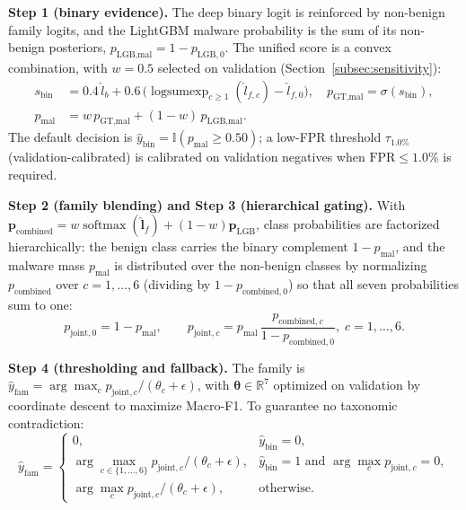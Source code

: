\documentclass[Number]{sn-jnl}
\begin{document}
\textbf{Step 1 (binary evidence).}
The deep binary logit is reinforced by non-benign family logits, and the LightGBM malware probability is the sum of its non-benign posteriors, $p_{\text{LGB},\text{mal}}=1-p_{\text{LGB},0}$. The unified score is a convex combination, with $w=0.5$ selected on validation (Section~\ref{subsec:sensitivity}):
\begin{equation}
\begin{aligned}
  s_\text{bin} &= 0.4\,\hat{l}_b + 0.6\,\Big(\operatorname{logsumexp}_{c \geq 1}(\hat{l}_{f,c}) - \hat{l}_{f,0}\Big),\quad p_{\text{GT},\text{mal}}=\sigma(s_\text{bin}),\\
  p_\text{mal} &= w\,p_{\text{GT},\text{mal}} + (1-w)\,p_{\text{LGB},\text{mal}}.
\end{aligned}
\end{equation}
The default decision is $\hat{y}_\text{bin}=\mathbb{I}(p_\text{mal}\ge0.50)$; a low-FPR threshold $\tau_{1.0\%}$ (validation-calibrated) is calibrated on validation negatives when $\text{FPR}\le1.0\%$ is required.

\textbf{Step 2 (family blending) and Step 3 (hierarchical gating).}
With $\mathbf{p}_\text{combined}=w\operatorname{softmax}(\hat{\mathbf{l}}_f)+(1-w)\mathbf{p}_\text{LGB}$, class probabilities are factorized hierarchically: the benign class carries the binary complement $1-p_\text{mal}$, and the malware mass $p_\text{mal}$ is distributed over the non-benign classes by normalizing $p_\text{combined}$ over $c=1,\dots,6$ (dividing by $1-p_{\text{combined},0}$) so that all seven probabilities sum to one:
\begin{equation}
  p_{\text{joint},0}=1-p_\text{mal},\qquad p_{\text{joint},c}=p_\text{mal}\,\frac{p_{\text{combined},c}}{1-p_{\text{combined},0}},\; c=1,\dots,6.
\end{equation}

\textbf{Step 4 (thresholding and fallback).}
The family is $\hat{y}_\text{fam}=\arg\max_c p_{\text{joint},c}/(\theta_c+\epsilon)$, with $\boldsymbol{\theta}\in\mathbb{R}^{7}$ optimized on validation by coordinate descent to maximize Macro-F1. To guarantee no taxonomic contradiction:
\begin{equation}
  \hat{y}_\text{fam} =
  \begin{cases}
    0, & \hat{y}_\text{bin} = 0, \\
    \arg\max_{c \in \{1,\dots,6\}} p_{\text{joint},c} / (\theta_c + \epsilon), & \hat{y}_\text{bin} = 1 \text{ and } \arg\max_c p_{\text{joint},c} = 0, \\
    \arg\max_{c} p_{\text{joint},c} / (\theta_c + \epsilon), & \text{otherwise}.
  \end{cases}
\end{equation}
\end{document}
